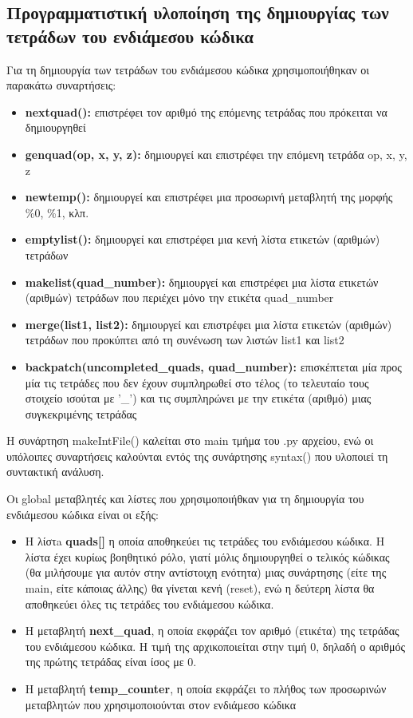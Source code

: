 \documentclass[12pt,a4paper]{article}
\begin{document}
\subsection{Προγραμματιστική υλοποίηση της δημιουργίας των τετράδων του ενδιάμεσου κώδικα}
Για τη δημιουργία των τετράδων του ενδιάμεσου κώδικα χρησιμοποιήθηκαν οι παρακάτω συναρτήσεις:
\begin{itemize}
    \item \textbf{nextquad():} επιστρέφει τον αριθμό της επόμενης τετράδας που πρόκειται να δημιουργηθεί

    \item \textbf{genquad(op, x, y, z):} δημιουργεί και επιστρέφει την επόμενη τετράδα op, x, y, z

    \item \textbf{newtemp():} δημιουργεί και επιστρέφει μια προσωρινή μεταβλητή της μορφής \%0, \%1, κλπ.
    \item \textbf{emptylist():} δημιουργεί και επιστρέφει μια κενή λίστα ετικετών (αριθμών) τετράδων
    \item \textbf{makelist(quad\_number):} δημιουργεί και επιστρέφει μια λίστα ετικετών (αριθμών) τετράδων που περιέχει μόνο την ετικέτα quad\_number
    \item \textbf{merge(list1, list2):} δημιουργεί και επιστρέφει μια λίστα ετικετών (αριθμών) τετράδων που προκύπτει από τη συνένωση των λιστών list1 και list2
    \item \textbf{backpatch(uncompleted\_quads, quad\_number):} επισκέπτεται μία προς μία τις τετράδες που δεν έχουν συμπληρωθεί στο τέλος (το τελευταίο τους στοιχείο ισούται με '\_') και τις συμπληρώνει με την ετικέτα (αριθμό) μιας συγκεκριμένης τετράδας
\end{itemize}

Η συνάρτηση makeIntFile() καλείται στο main τμήμα του .py αρχείου, ενώ οι υπόλοιπες συναρτήσεις καλούνται εντός της συνάρτησης syntax() που υλοποιεί τη συντακτική ανάλυση.

Οι global μεταβλητές και λίστες που χρησιμοποιήθκαν για τη δημιουργία του ενδιάμεσου κώδικα είναι οι εξής:
\begin{itemize}
    \item H λίστa \textbf{quads[]} η οποία αποθηκεύει τις τετράδες του ενδιάμεσου κώδικα. Η λίστα έχει κυρίως βοηθητικό ρόλο, γιατί μόλις δημιουργηθεί ο τελικός κώδικας (θα μιλήσουμε για αυτόν στην αντίστοιχη ενότητα) μιας συνάρτησης (είτε της main, είτε κάποιας άλλης) θα γίνεται κενή (reset), ενώ η δεύτερη λίστα θα αποθηκεύει όλες τις τετράδες του ενδιάμεσου κώδικα.
    \item Η μεταβλητή \textbf{next\_quad}, η οποία εκφράζει τον αριθμό (ετικέτα) της τετράδας του ενδιάμεσου κώδικα. Η τιμή της αρχικοποιείται στην τιμή 0, δηλαδή ο αριθμός της πρώτης τετράδας είναι ίσος με 0.
    \item Η μεταβλητή \textbf{temp\_counter}, η οποία εκφράζει το πλήθος των προσωρινών μεταβλητών που χρησιμοποιούνται στον ενδιάμεσο κώδικα
\end{itemize}
\end{document}
